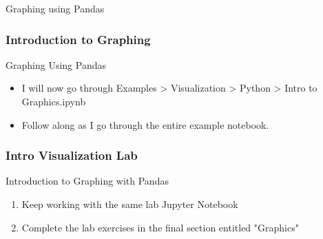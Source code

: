 \documentclass[handout, 11pt]{beamer}
\begin{document}
\begin{section}[Graphs]{Graphing using Pandas}
\begin{frame}
\begin{adjustbox}{width=0.425\textwidth, height=0.8\textheight, keepaspectratio}
\end{adjustbox}
\end{frame}
\begin{frame}
\frametitle{Introduction to Graphing}
{
\begin{block}{Graphing Using Pandas}
\begin{itemize}
\item I will now go through Examples > Visualization > Python > Intro to Graphics.ipynb
\item Follow along as I go through the entire example notebook.
\end{itemize}
\end{block}
}
\end{frame}
\begin{frame}
\frametitle{Intro Visualization Lab}
{
\begin{block}{Introduction to Graphing with Pandas}
\begin{enumerate}
\item Keep working with the same lab Jupyter Notebook
\item Complete the lab exercises in the final section entitled "Graphics"
\end{enumerate}
\vfill
\end{block}
}
\label{labs:intro-visualization-lab-1}
\end{frame}
\end{section}
\end{document}
